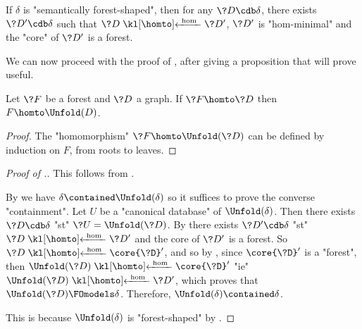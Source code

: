 \begin{corollary}
	\AP\label{coro:all-cdb-are-dominated-by-forests}
	If $\delta$ is "semantically forest-shaped", then for any
	$\?D \cdb \delta$, there exists $\?D' \cdb \delta$ such that
	$\?D \cohomto \?D'$, $\?D'$ is "hom-minimal" and the "core" of $\?D'$ is a forest.
\end{corollary}

We can now proceed with the proof of , after giving a
proposition that will prove useful.

\begin{proposition}
	\AP\label{prop:hom-from-forest}
	Let $\?F$ be a forest and $\?D$ a graph. If $\?F \homto \?D$ then $F \homto \Unfold(D)$.
\end{proposition}

\begin{proof}
	The "homomorphism" $\?F \homto \Unfold(\?D)$ can be defined by induction on $F$, from roots
	to leaves.
\end{proof}

\begin{proof}[Proof of .]
	 This follows from
	.

	 By  we have $\delta \contained \Unfold(\delta)$ so it suffices to prove the converse "containment".
	Let $U$ be a "canonical database" of $\Unfold(\delta)$. Then there exists $\?D \cdb \delta$
	"st" $\?U = \Unfold(\?D)$. By  there exists
	$\?D' \cdb \delta$ "st" $\?D \cohomto \?D'$ and the core of $\?D'$ is a forest. So $\?D \cohomto \core{\?D}'$, and so by , since $\core{\?D}'$ is a "forest",
	then $\Unfold(\?D) \cohomto \core{\?D}'$ "ie" $\Unfold(\?D) \cohomto \?D'$, which proves
	that $\Unfold(\?D) \FOmodels \delta$. Therefore, $\Unfold(\delta) \contained \delta$.

	 This is because $\Unfold(\delta)$ is "forest-shaped"
		by .
\end{proof}